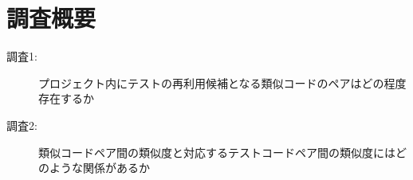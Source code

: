 \documentclass{fose2019}           %
\begin{document}

\section{調査概要}
\begin{description}
\item[調査1:]プロジェクト内にテストの再利用候補となる類似コードのペアはどの程度存在するか
\item[調査2:]類似コードペア間の類似度と対応するテストコードペア間の類似度にはどのような関係があるか
\end{description}
\end{document}
